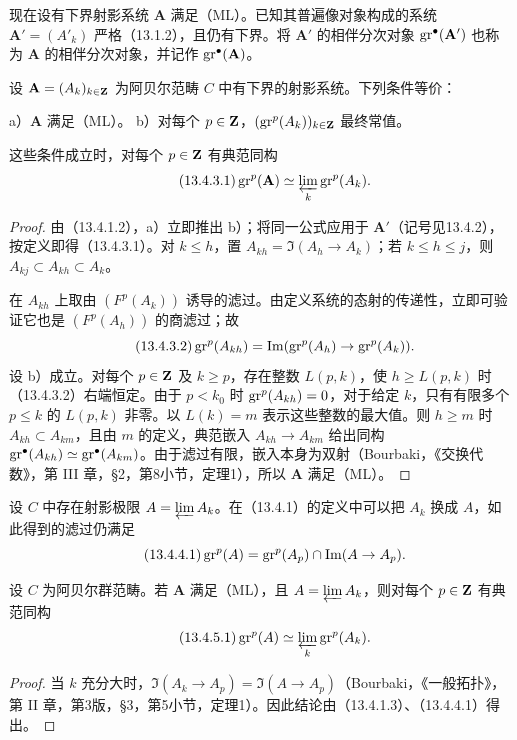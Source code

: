 现在设有下界射影系统 $\mathbf A$ 满足（ML）。已知其普遍像对象构成的系统 $\mathbf A'=(A'_k)$ 严格（13.1.2），且仍有下界。将 $\mathbf A'$ 的相伴分次对象 $\operatorname{gr}^\bullet(\mathbf A')$ 也称为 $\mathbf A$ 的相伴分次对象，并记作 $\operatorname{gr}^\bullet(\mathbf A)$。

设 $\mathbf A=(A_k)_{k\in\mathbf Z}$ 为阿贝尔范畴 $C$ 中有下界的射影系统。下列条件等价：

\noindent a）$\mathbf A$ 满足（ML）。\qquad
b）对每个 $p\in\mathbf Z$，$(\operatorname{gr}^p(A_k))_{k\in\mathbf Z}$ 最终常值。

这些条件成立时，对每个 $p\in\mathbf Z$ 有典范同构
\begin{equation}\tag{13.4.3.1}
\operatorname{gr}^p(\mathbf A)\simeq\varprojlim_k\operatorname{gr}^p(A_k).
\end{equation}
\begin{proof}
由（13.4.1.2），a）立即推出 b）；将同一公式应用于 $\mathbf A'$（记号见13.4.2），按定义即得（13.4.3.1）。对 $k\leq h$，置 $A_{kh}=\Im(A_h\to A_k)$；若 $k\leq h\leq j$，则 $A_{kj}\subset A_{kh}\subset A_k$。

在 $A_{kh}$ 上取由 $(F^p(A_k))$ 诱导的滤过。由定义系统的态射的传递性，立即可验证它也是 $(F^p(A_h))$ 的商滤过；故
\begin{equation}\tag{13.4.3.2}
\operatorname{gr}^p(A_{kh})=\operatorname{Im}(\operatorname{gr}^p(A_h)\to\operatorname{gr}^p(A_k)).
\end{equation}
设 b）成立。对每个 $p\in\mathbf Z$ 及 $k\geq p$，存在整数 $L(p,k)$，使 $h\geq L(p,k)$ 时（13.4.3.2）右端恒定。由于 $p<k_0$ 时 $\operatorname{gr}^p(A_{kh})=0$，对于给定 $k$，只有有限多个 $p\leq k$ 的 $L(p,k)$ 非零。以 $L(k)=m$ 表示这些整数的最大值。则 $h\geq m$ 时 $A_{kh}\subset A_{km}$，且由 $m$ 的定义，典范嵌入 $A_{kh}\to A_{km}$ 给出同构 $\operatorname{gr}^\bullet(A_{kh})\simeq\operatorname{gr}^\bullet(A_{km})$。由于滤过有限，嵌入本身为双射（Bourbaki，《交换代数》，第 III 章，§2，第8小节，定理1），所以 $\mathbf A$ 满足（ML）。
\end{proof}

设 $C$ 中存在射影极限 $A=\varprojlim A_k$。在（13.4.1）的定义中可以把 $A_k$ 换成 $A$，如此得到的滤过仍满足
\begin{equation}\tag{13.4.4.1}
\operatorname{gr}^p(A)=\operatorname{gr}^p(A_p)\cap\operatorname{Im}(A\to A_p).
\end{equation}

设 $C$ 为阿贝尔群范畴。若 $\mathbf A$ 满足（ML），且 $A=\varprojlim A_k$，则对每个 $p\in\mathbf Z$ 有典范同构
\begin{equation}\tag{13.4.5.1}
\operatorname{gr}^p(A)\simeq\varprojlim_k\operatorname{gr}^p(A_k).
\end{equation}
\begin{proof}
当 $k$ 充分大时，$\Im(A_k\to A_p)=\Im(A\to A_p)$（Bourbaki，《一般拓扑》，第 II 章，第3版，§3，第5小节，定理1）。因此结论由（13.4.1.3）、（13.4.4.1）得出。
\end{proof}

